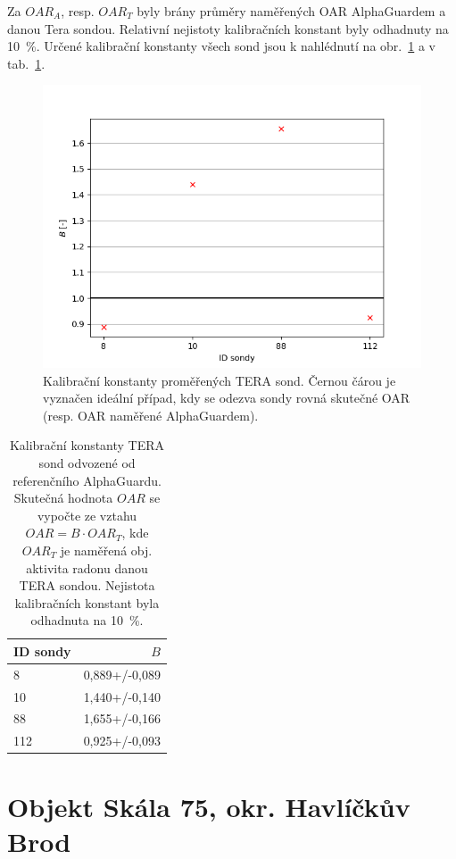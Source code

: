 Za $OAR_A$, resp. $OAR_T$ byly brány průměry naměřených OAR AlphaGuardem a danou Tera sondou. Relativní nejistoty kalibračních konstant byly odhadnuty na 10~\%. Určené kalibrační konstanty všech sond jsou k nahlédnutí na obr.~\ref{fig:dynMer_sondyB} a v tab.~\ref{tab:dynMer_sondyB}. %
\begin{figure}[H]
	\centering
	\includegraphics[width=0.7\linewidth]{images/sondy_B}
	\caption{Kalibrační konstanty proměřených TERA sond. Černou čárou je vyznačen ideální případ, kdy se odezva sondy rovná skutečné OAR (resp. OAR naměřené AlphaGuardem).}
	\label{fig:dynMer_sondyB}
\end{figure}
\begin{table}[ht]
	\centering
	\caption{Kalibrační konstanty TERA sond odvozené od referenčního AlphaGuardu. Skutečná hodnota $OAR$ se vypočte ze vztahu $OAR=B\cdot OAR_T$, kde $OAR_T$ je naměřená obj. aktivita radonu danou TERA sondou. Nejistota kalibračních konstant byla odhadnuta na 10~\%.}
	\label{tab:dynMer_sondyB}
	\begin{tabular}{lr}
		\toprule
		ID sondy &     $B$ \\
		\midrule
		8   & 0,889+/-0,089\\
		10  & 1,440+/-0,140\\
		88  & 1,655+/-0,166\\
		112 & 0,925+/-0,093\\
		\bottomrule
	\end{tabular}
\end{table}
\section{Objekt Skála 75, okr. Havlíčkův Brod}
